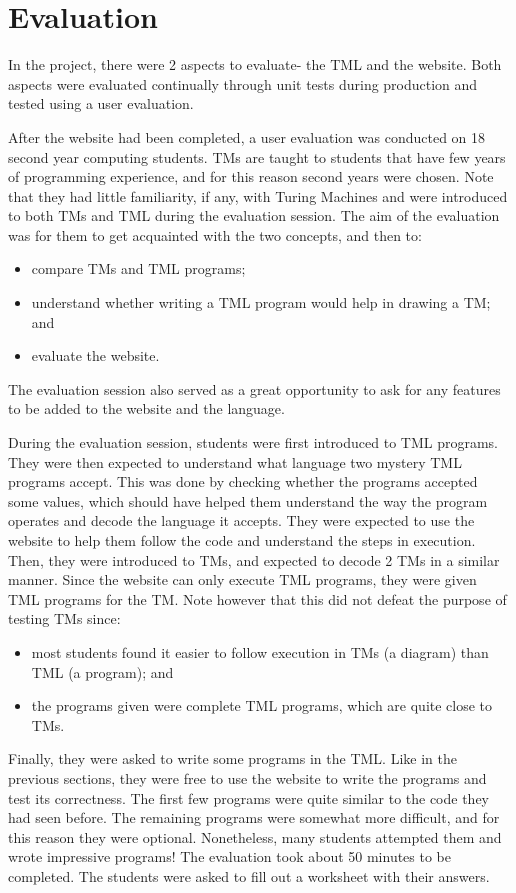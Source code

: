 \chapter{Evaluation} 
In the project, there were 2 aspects to evaluate- the TML and the website. Both aspects were evaluated continually through unit tests during production and tested using a user evaluation.

After the website had been completed, a user evaluation was conducted on 18 second year computing students. TMs are taught to students that have few years of programming experience, and for this reason second years were chosen. Note that they had little familiarity, if any, with Turing Machines and were introduced to both TMs and TML during the evaluation session. The aim of the evaluation was for them to get acquainted with the two concepts, and then to:
\begin{itemize}
    \item compare TMs and TML programs;
    \item understand whether writing a TML program would help in drawing a TM; and
    \item evaluate the website.
\end{itemize}
The evaluation session also served as a great opportunity to ask for any features to be added to the website and the language.

During the evaluation session, students were first introduced to TML programs. They were then expected to understand what language two mystery TML programs accept. This was done by checking whether the programs accepted some values, which should have helped them understand the way the program operates and decode the language it accepts. They were expected to use the website to help them follow the code and understand the steps in execution. Then, they were introduced to TMs, and expected to decode 2 TMs in a similar manner. Since the website can only execute TML programs, they were given TML programs for the TM. Note however that this did not defeat the purpose of testing TMs since:
\begin{itemize}
    \item most students found it easier to follow execution in TMs (a diagram) than TML (a program); and
    \item the programs given were complete TML programs, which are quite close to TMs.
\end{itemize}
Finally, they were asked to write some programs in the TML. Like in the previous sections, they were free to use the website to write the programs and test its correctness. The first few programs were quite similar to the code they had seen before. The remaining programs were somewhat more difficult, and for this reason they were optional. Nonetheless, many students attempted them and wrote impressive programs! The evaluation took about 50 minutes to be completed. The students were asked to fill out a worksheet with their answers. 


